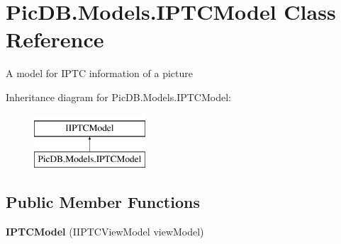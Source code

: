 \hypertarget{class_pic_d_b_1_1_models_1_1_i_p_t_c_model}{}\section{Pic\+D\+B.\+Models.\+I\+P\+T\+C\+Model Class Reference}
\label{class_pic_d_b_1_1_models_1_1_i_p_t_c_model}


A model for I\+P\+TC information of a picture  


Inheritance diagram for Pic\+D\+B.\+Models.\+I\+P\+T\+C\+Model\+:\begin{figure}[H]
\begin{center}
\leavevmode
\includegraphics[height=2.000000cm]{class_pic_d_b_1_1_models_1_1_i_p_t_c_model}
\end{center}
\end{figure}
\subsection*{Public Member Functions}
\begin{DoxyCompactItemize}
\item 
\mbox{\label{class_pic_d_b_1_1_models_1_1_i_p_t_c_model_a5ead69afb51c0335e36d1668be1a4ae2}} 
{\bfseries I\+P\+T\+C\+Model} (I\+I\+P\+T\+C\+View\+Model view\+Model)
\end{DoxyCompactItemize}
